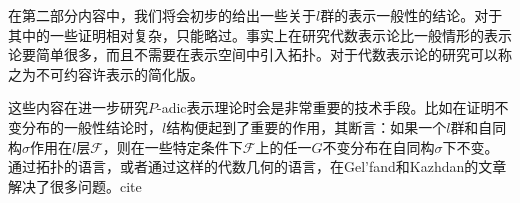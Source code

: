 \documentclass{article}
\begin{document}
在第二部分内容中，我们将会初步的给出一些关于$l$群的表示一般性的结论。对于其中的一些证明相对复杂，只能略过。事实上在研究代数表示论比一般情形的表示论要简单很多，而且不需要在表示空间中引入拓扑。对于代数表示论的研究可以称之为不可约容许表示的简化版。

这些内容在进一步研究$P$-adic表示理论时会是非常重要的技术手段。比如在证明不变分布的一般性结论时，$l$结构便起到了重要的作用，其断言：如果一个$l$群和自同构$\sigma$作用在$l$层$\mathcal{F}$，则在一些特定条件下$\mathcal{F}$上的任一$G$不变分布在自同构$\sigma$下不变。通过拓扑的语言，或者通过这样的代数几何的语言，在Gel'fand和Kazhdan的文章解决了很多问题。cite
\end{document}
